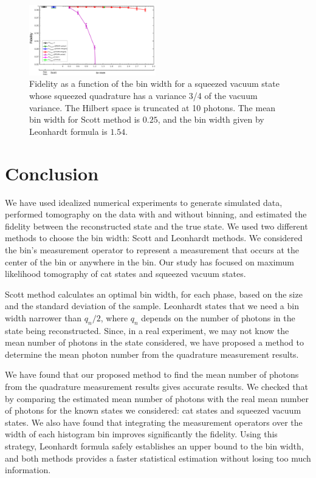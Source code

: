 \documentclass[
reprint,
superscriptaddress,
showpacs,
amsmath,
amssymb,
aps,
pra,
longbibliography
]{revtex4-1}
\begin{document}
\begin{figure}[h]
\includegraphics[width=0.49\textwidth]{squeezed_vacuum_variance_075_Mph_10.eps}
\caption{Fidelity as a function of the bin width for a squeezed vacuum state whose squeezed quadrature has a variance 3/4 of the vacuum variance. The Hilbert space is truncated at 10 photons. The mean bin width for Scott method is $0.25$, and the bin width given by Leonhardt formula is $1.54$.}
\label{fig-squeezed_vacuum_variance_075_Mph_10}
\end{figure}

\section{Conclusion}
\label{conclusion}

We have used idealized numerical experiments to generate simulated
data, performed tomography on the data with and without binning, and estimated the fidelity between the reconstructed state and the true state. We used two different
methods to choose the bin width: Scott and Leonhardt methods. We considered the bin’s measurement operator to represent a measurement that occurs at the center of the bin or anywhere in the bin. Our study has focused on maximum likelihood tomography of cat states and squeezed vacuum states. 

Scott method calculates an optimal bin width, for each phase, based on the size and
the standard deviation of the sample. Leonhardt states that we need a bin width
narrower than $q_n/2$, where $q_n$ depends on the number of photons in the state
being reconstructed. Since, in a real experiment, we may not know the mean number
of photons in the state considered, we have proposed a method to determine the 
mean photon number from the quadrature measurement results.    

We have found that our proposed method to find the mean number of photons from the quadrature measurement results gives accurate results. We checked that by comparing
the estimated mean number of photons with the real mean number of photons for the
known states we considered: cat states and squeezed vacuum states. We also have found that integrating the measurement operators over the width of each histogram bin improves significantly the fidelity. Using this strategy, Leonhardt formula safely establishes an upper bound to the bin width, and both methods provides a faster statistical estimation without losing too much information. 
\end{document}
